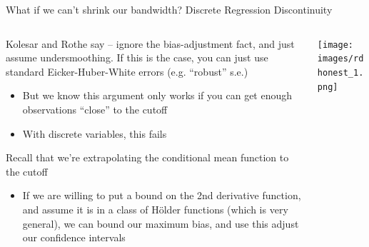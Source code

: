 \documentclass[notes,11pt, aspectratio=169]{beamer}
\newenvironment{wideitemize}{\itemize\addtolength{\itemsep}{10pt}}{\enditemize}
\begin{document}
\begin{frame}{What if we can't shrink our bandwidth? Discrete Regression Discontinuity}
    \begin{columns}[onlytextwidth, T] %
      \begin{column}{.6\textwidth}
        \begin{wideitemize}
        \item Kolesar and Rothe say -- ignore the bias-adjustment
          fact, and just assume undersmoothing. If this is the case,
          you can just use standard Eicker-Huber-White errors
          (e.g. ``robust'' s.e.)
          \begin{itemize}
          \item But we know this argument only works if you can get
            enough observations ``close'' to the cutoff
          \item With discrete variables, this fails
          \end{itemize}
        \item Recall that we're extrapolating the conditional mean function to the cutoff
          \begin{itemize}
          \item If we are willing to put a bound on the 2nd derivative
            function, and assume it is in a class of H\"older
            functions (which is very general), we can bound our
            maximum bias, and use this adjust our confidence intervals
          \end{itemize}
        \end{wideitemize}
      \end{column}%
      \hfill%
      \begin{column}{.4\textwidth}
        \texttt{[image: images/rdhonest\_1.png]}
      \end{column}%
    \end{columns}
\end{frame}
\end{document}

